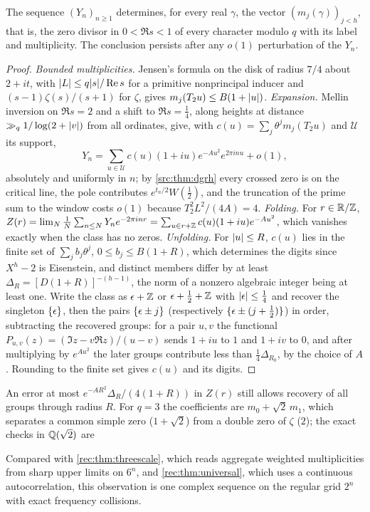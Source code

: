 \begin{theorem}\label{rec:thm:dyadic}
The sequence $(Y_n)_{n\ge1}$ determines, for every real $\gamma$, the vector $(m_j(\gamma))_{j<h}$, that is, the
zero divisor in $0<\Re s<1$ of every character modulo $q$ with its label and multiplicity. The
conclusion persists after any $o(1)$ perturbation of the $Y_n$.
\end{theorem}

\begin{proof}
\emph{Bounded multiplicities.} Jensen's formula on the disk of radius $7/4$ about $2+it$, with
$\lvert L\rvert\le q\lvert s\rvert/\operatorname{Re} s$ for a primitive nonprincipal inducer and $(s-1)\zeta(s)/(s+1)$ for $\zeta$, gives
$m_j(T_2u)\le B(1+\lvert u\rvert)$. \emph{Expansion.} Mellin inversion on $\Re s=2$ and a shift to $\Re s=\tfrac14$,
along heights at distance $\gg_q1/\log(2+\lvert v\rvert)$ from all ordinates, give, with $c(u)=\sum_j\theta^jm_j(T_2u)$ and
$\mathcal U$ its support,
\[
 Y_n=\sum_{u\in\mathcal U}c(u)(1+iu)e^{-Au^2}e^{2\pi inu}+o(1),
\]
absolutely and uniformly in $n$; by \cref{src:thm:dgrh} every crossed zero is on the critical line, the
pole contributes $e^{t_n/2}W(\tfrac12)$, and the truncation of the prime sum to the window costs $o(1)$
because $T_2^2L^2/(4A)=4$. \emph{Folding.} For $r\in\mathbb{R}/\mathbb{Z}$,
$Z(r)=\lim_N\frac1N\sum_{n\le N}Y_ne^{-2\pi inr}=\sum_{u\in r+\mathbb{Z}}c(u)(1+iu)e^{-Au^2}$, which vanishes exactly when the
class has no zeros. \emph{Unfolding.} For $\lvert u\rvert\le R$, $c(u)$ lies in the finite set of
$\sum_jb_j\theta^j$, $0\le b_j\le B(1+R)$, which determines the digits since $X^h-2$ is Eisenstein, and distinct
members differ by at least $\Delta_R=[D(1+R)]^{-(h-1)}$, the norm of a nonzero algebraic integer being at
least one. Write the class as $\epsilon+\mathbb{Z}$ or $\epsilon+\tfrac12+\mathbb{Z}$ with $\lvert\epsilon\rvert\le\tfrac14$ and recover the singleton
$\{\epsilon\}$, then the pairs $\{\epsilon\pm j\}$ (respectively $\{\epsilon\pm(j+\tfrac12)\}$) in order, subtracting
the recovered groups: for a pair $u,v$ the functional $P_{u,v}(z)=(\Im z-v\Re z)/(u-v)$ sends $1+iu$ to $1$ and
$1+iv$ to $0$, and after multiplying by $e^{Au^2}$ the later groups contribute less than $\tfrac14\Delta_{R_0}$, by
the choice of $A$. Rounding to the finite set gives $c(u)$ and its digits.
\end{proof}

An error at most $e^{-AR^2}\Delta_R/(4(1+R))$ in $Z(r)$ still allows recovery of all groups through radius $R$.
For $q=3$ the coefficients are $m_0+\sqrt2\,m_1$, which separates a common simple zero ($1+\sqrt2$) from a
double zero of $\zeta$ ($2$); the exact checks in $\mathbb{Q}(\sqrt2)$ are
\begin{center}
\end{center}
Compared with
\cref{rec:thm:threescale}, which reads aggregate weighted multiplicities from sharp upper limits on $6^n$,
and \cref{rec:thm:universal}, which uses a continuous autocorrelation, this observation is one complex
sequence on the regular grid $2^n$ with exact frequency collisions.

